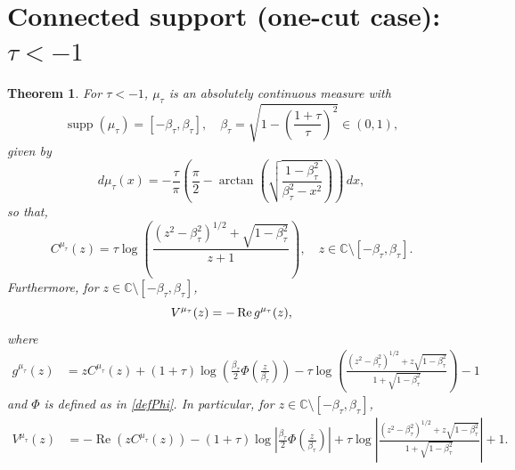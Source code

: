 \documentclass[reqno,11pt]{amsart}
\theoremstyle{plain}
\newtheorem{theorem}{Theorem}[section]
\theoremstyle{definition}
\theoremstyle{remark}
\numberwithin{equation}{section}
\renewcommand{\Re}{\mathop{\rm Re}}
\DeclareMathOperator{\supp}{supp}
\newcommand{\C}{\mathbb{C}}
\begin{document}
\section{Connected support (one-cut case): \texorpdfstring{$\tau<-1$}{\tau<-1}} \label{sec:case2}

\begin{theorem}\label{theorem_case_tau<-1}
    For $\tau<-1$, $\mu_\tau$ is an absolutely continuous measure with 
    \begin{equation}\label{supp_mu_tau<-1}
        \supp(\mu_\tau)=\left[-\beta_\tau,\beta_\tau\right], \quad \beta_\tau= \sqrt{1-\left(\frac{1+\tau}{\tau}\right)^2 }\in (0,1),
    \end{equation}
    given by 
    \begin{equation}\label{mu_tau<-1_expression_1}
        d\mu_\tau(x)=-\frac{\tau}{\pi}\left(\frac{\pi}{2}-\arctan \left( \sqrt{\frac{1-\beta_\tau^2}{\beta_\tau^2-x^2}}\right)\right)\, dx,
    \end{equation}
so that,
\begin{equation}\label{Cauchy_Transform_tau<-1_expression_2}
        C^{\mu_\tau}(z)
        = \tau\log\left(\frac{(z^2-\beta_\tau^2)^{1/2}+\sqrt{1-\beta_\tau^2}}{z+1}\right), \quad z\in \C\setminus\left[-\beta_\tau,\beta_\tau\right].
    \end{equation}
    Furthermore, for $z\in \C\setminus [-\beta_\tau,\beta_\tau]$,  
    $$
     V^{\mu_\tau}(z)=- \Re g^{\mu_\tau}(z), 
    $$
    where
    \begin{equation}\label{g_function_tau<-1}
    \begin{split}
        g^{\mu_\tau}(z)&=zC^{\mu_\tau}(z)+(1+\tau)\log\left(\frac{\beta_\tau}{2}\Phi\left(\frac{z}{\beta_\tau}\right)\right)-\tau\log\left(\frac{(z^2-\beta_\tau^2)^{1/2}+z\sqrt{1-\beta_\tau^2}}{1+\sqrt{1-\beta_\tau^2}}\right)-1
    \end{split}
    \end{equation}
    and $\Phi$ is defined as in \eqref{defPhi}. In particular, for $z\in\mathbb{C}\setminus[-\beta_\tau,\beta_\tau]$,
    \begin{equation}\label{log_potential_tau<-1}
    \begin{split}
        V^{\mu_\tau}(z)&=-\operatorname{Re}(zC^{\mu_\tau}(z))-(1+\tau)\log\left|\frac{\beta_\tau}{2}\Phi\left(\frac{z}{\beta_\tau}\right)\right|+\tau\log\left|\frac{(z^2-\beta_\tau^2)^{1/2}+z\sqrt{1-\beta_\tau^2}}{1+\sqrt{1-\beta_\tau^2}}\right|+1.

\end{split}
\end{equation}
\end{theorem}
\end{document}
